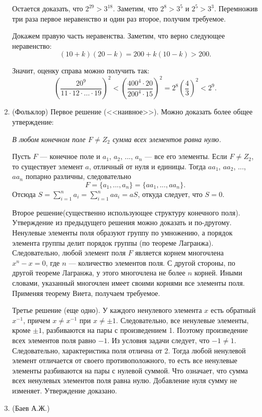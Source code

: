 \documentclass[11pt, a4paper]{article}
\begin{document}
\begin{enumerate}
Остается доказать, что $2^{29} > 3^{18}$. Заметим, что $2^8>3^5$ и $2^5>3^3$. Перемножив три раза первое неравенство и один раз второе, получим требуемое.

Докажем правую часть неравенства. Заметим, что верно следующее неравенство:
$$(10+k) (20-k) = 200 + k (10 - k) > 200.$$

Значит, оценку справа можно получить так:
$$\left( \frac{20^9}{11 \cdot 12 \cdot \ldots \cdot 19} \right)^2 < \left( \frac{400^4 \cdot 20}{200^4 \cdot 15} \right)^2 = 2^8 \left( \frac{4}{3} \right)^2 < 2^9.$$


\item (Фольклор) Первое решение (<<наивное>>). Можно доказать более общее утверждение:

\textit{В любом конечном поле $F \ne Z_2$ сумма всех элементов равна нулю.}

Пусть $F$ --- конечное поле и $a_1$, $a_2$, ..., $a_n$ --- все его элементы. Если $F \ne Z_2$, то существует элемент $a$, отличный от нуля и единицы. Тогда $a a_1$, $a a_2$, ..., $a a_n$ попарно различны, следовательно
$$F = \{ a_1, ..., a_n \} = \{ a a_1, ..., a a_n \} .$$
Отсюда $S = \sum_{i=1}^{n} a_i = \sum_{i=1}^n a a_i = a S$, откуда следует, что $S = 0$.

Второе решение(существенно использующее структуру конечного поля). Утверждение из предыдущего решения можно доказать и по-другому. Ненулевые элементы поля образуют группу по умножению, а порядок элемента группы делит порядок группы (по теореме  Лагранжа). Следовательно, любой элемент поля $F$ является корнем многочлена $x^n - x = 0$, где $n$ --- количество элементов поля. С другой стороны, по другой теореме Лагранжа, у этого многочлена не более $n$ корней. Иными словами, указанный многочлен имеет своими корнями все элементы поля. Применяя теорему Виета, получаем требуемое. 

Третье решение (еще одно). У каждого ненулевого элемента $x$ есть обратный $x^{-1}$, причем $x \ne x^{-1}$ при $x \ne \pm 1$. Следовательно, все ненулевые элементы, кроме $\pm 1$, разбиваются на пары с произведением 1. Поэтому произведение всех элементов поля равно $-1$. Из условия задачи следует, что $-1 \ne 1$. Следовательно, характеристика поля отлична от 2. Тогда любой ненулевой элемент отличается от своего противоположного, то есть все ненулевые элементы разбиваются на пары с нулевой суммой. Что означает, что сумма всех ненулевых элементов поля равна нулю. Добавление нуля сумму не изменяет. Утверждение доказано.    

\item  (Баев А.Ж.) 


\end{enumerate}
\end{document}
